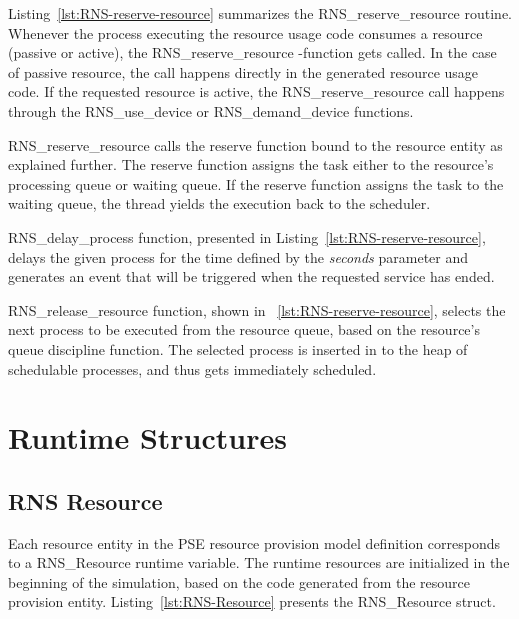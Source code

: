 

Listing~\ref{lst:RNS-reserve-resource} summarizes the RNS\_reserve\_resource routine. Whenever the process executing the resource usage code consumes a resource (passive or active), the RNS\_reserve\_resource -function gets called. In the case of passive resource, the call happens directly in the generated resource usage code. If the requested resource is active, the RNS\_reserve\_resource call happens through the RNS\_use\_device or RNS\_demand\_device functions.

RNS\_reserve\_resource calls the reserve function bound to the resource entity as explained further. The reserve function assigns the task either to the resource's processing queue or waiting queue. If the reserve function assigns the task to the waiting queue, the thread yields the execution back to the scheduler.



RNS\_delay\_process function, presented in Listing~\ref{lst:RNS-reserve-resource}, delays the given process for the time defined by the \emph{seconds} parameter and generates an event that will be triggered when the requested service has ended.



RNS\_release\_resource function, shown in ~\ref{lst:RNS-reserve-resource}, selects the next process to be executed from the resource queue, based on the resource's queue discipline function. The selected process is inserted in to the heap of schedulable processes, and thus gets immediately scheduled.

\section{Runtime Structures}
\subsection{RNS Resource}
Each resource entity in the PSE resource provision model definition corresponds to a RNS\_Resource runtime variable. The runtime resources are initialized in the beginning of the simulation, based on the code generated from the resource provision entity. Listing~\ref{lst:RNS-Resource} presents the RNS\_Resource struct.

